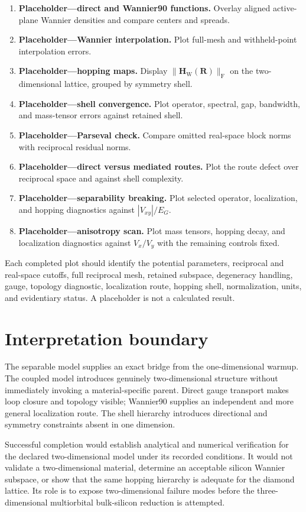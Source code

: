 \begin{enumerate}
    \item \textbf{Placeholder---direct and Wannier90 functions.} Overlay aligned
          active-plane Wannier densities and compare centers and spreads.
    \item \textbf{Placeholder---Wannier interpolation.} Plot full-mesh and
          withheld-point interpolation errors.
    \item \textbf{Placeholder---hopping maps.} Display
          $\lVert\mathbf H_{\mathrm W}(\mathbf R)\rVert_{\mathrm F}$ on the
          two-dimensional lattice, grouped by symmetry shell.
    \item \textbf{Placeholder---shell convergence.} Plot operator, spectral,
          gap, bandwidth, and mass-tensor errors against retained shell.
    \item \textbf{Placeholder---Parseval check.} Compare omitted real-space
          block norms with reciprocal residual norms.
    \item \textbf{Placeholder---direct versus mediated routes.} Plot the route
          defect over reciprocal space and against shell complexity.
    \item \textbf{Placeholder---separability breaking.} Plot selected operator,
          localization, and hopping diagnostics against
          $|V_{xy}|/E_G$.
    \item \textbf{Placeholder---anisotropy scan.} Plot mass tensors, hopping
          decay, and localization diagnostics against $V_x/V_y$ with the
          remaining controls fixed.
\end{enumerate}
Each completed plot should identify the potential parameters, reciprocal and
real-space cutoffs, full reciprocal mesh, retained subspace, degeneracy
handling, gauge, topology diagnostic, localization route, hopping shell,
normalization, units, and evidentiary status. A placeholder is not a calculated
result.

\section*{Interpretation boundary}

The separable model supplies an exact bridge from the one-dimensional warmup.
The coupled model introduces genuinely two-dimensional structure without
immediately invoking a material-specific parent. Direct gauge transport makes
loop closure and topology visible; Wannier90 supplies an independent and more
general localization route. The shell hierarchy introduces directional and
symmetry constraints absent in one dimension.

Successful completion would establish analytical and numerical verification
for the declared two-dimensional model under its recorded conditions. It would
not validate a two-dimensional material, determine an acceptable silicon
Wannier subspace, or show that the same hopping hierarchy is adequate for the
diamond lattice. Its role is to expose two-dimensional failure modes before the
three-dimensional multiorbital bulk-silicon reduction is attempted.
